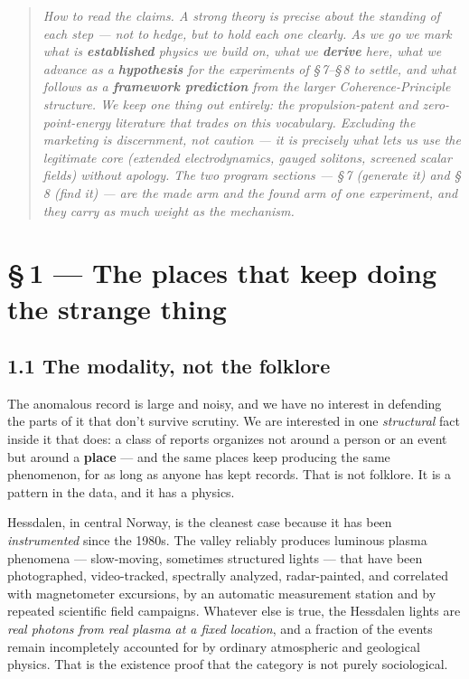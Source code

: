 \documentclass[11pt]{article}
\begin{document}
\begin{quote}\emph{How to read the claims. A strong theory is precise about the standing of each step --- not to hedge, but to hold each one clearly. As we go we mark what is \textbf{established} physics we build on, what we \textbf{derive} here, what we advance as a \textbf{hypothesis} for the experiments of \S\,7--\S\,8 to settle, and what follows as a \textbf{framework prediction} from the larger Coherence-Principle structure. We keep one thing out entirely: the propulsion-patent and zero-point-energy literature that trades on this vocabulary. Excluding the marketing is discernment, not caution --- it is precisely what lets us use the legitimate core (extended electrodynamics, gauged solitons, screened scalar fields) without apology. The two program sections --- \S\,7 (generate it) and \S\,8 (find it) --- are the made arm and the found arm of one experiment, and they carry as much weight as the mechanism.}\end{quote}

\section*{\S\,1 --- The places that keep doing the strange thing}
\subsection*{1.1 The modality, not the folklore}
The anomalous record is large and noisy, and we have no interest in defending the parts of it that don't survive scrutiny. We are interested in one \emph{structural} fact inside it that does: a class of reports organizes not around a person or an event but around a \textbf{place} --- and the same places keep producing the same phenomenon, for as long as anyone has kept records. That is not folklore. It is a pattern in the data, and it has a physics.

Hessdalen, in central Norway, is the cleanest case because it has been \emph{instrumented} since the 1980s. The valley reliably produces luminous plasma phenomena --- slow-moving, sometimes structured lights --- that have been photographed, video-tracked, spectrally analyzed, radar-painted, and correlated with magnetometer excursions, by an automatic measurement station and by repeated scientific field campaigns. Whatever else is true, the Hessdalen lights are \emph{real photons from real plasma at a fixed location}, and a fraction of the events remain incompletely accounted for by ordinary atmospheric and geological physics. That is the existence proof that the category is not purely sociological.
\end{document}
